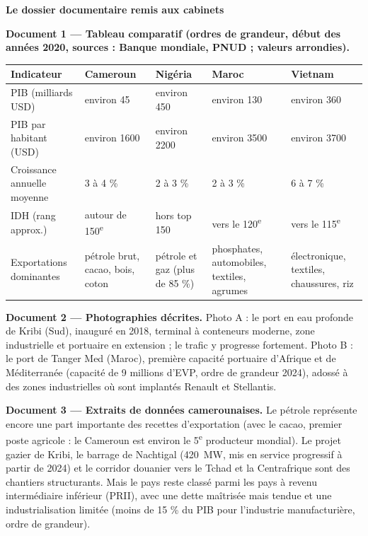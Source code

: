 \documentclass[11pt]{article}
\newcommand{\cle}[1]{{\popxbold\color{popdark}#1}}
\begin{document}
\textbf{Le dossier documentaire remis aux cabinets}

\textbf{Document 1 — Tableau comparatif (ordres de grandeur, début des années 2020, sources : Banque mondiale, PNUD ; valeurs arrondies).}

\begin{center}
\begin{tabularx}{\linewidth}{|l|X|X|X|X|}
\hline
\rowcolor{popblueL} \textbf{Indicateur} & \textbf{Cameroun} & \textbf{Nigéria} & \textbf{Maroc} & \textbf{Vietnam} \\
\hline
PIB (milliards USD) & environ \num{45} & environ \num{450} & environ \num{130} & environ \num{360} \\
\hline
PIB par habitant (USD) & environ \num{1600} & environ \num{2200} & environ \num{3500} & environ \num{3700} \\
\hline
Croissance annuelle moyenne & 3 à 4 \% & 2 à 3 \% & 2 à 3 \% & 6 à 7 \% \\
\hline
IDH (rang approx.) & autour de 150\textsuperscript{e} & hors top 150 & vers le 120\textsuperscript{e} & vers le 115\textsuperscript{e} \\
\hline
Exportations dominantes & pétrole brut, cacao, bois, coton & pétrole et gaz (plus de 85 \%) & phosphates, automobiles, textiles, agrumes & électronique, textiles, chaussures, riz \\
\hline
\end{tabularx}
\end{center}

\textbf{Document 2 — Photographies décrites.} Photo A : le \cle{port en eau profonde de Kribi} (Sud), inauguré en 2018, terminal à conteneurs moderne, zone industrielle et portuaire en extension ; le trafic y progresse fortement. Photo B : le port de \cle{Tanger Med} (Maroc), première capacité portuaire d'Afrique et de Méditerranée (capacité de 9 millions d'EVP, ordre de grandeur 2024), adossé à des zones industrielles où sont implantés Renault et Stellantis.

\textbf{Document 3 — Extraits de données camerounaises.} Le pétrole représente encore une part importante des recettes d'exportation (avec le cacao, premier poste agricole : le Cameroun est environ le 5\textsuperscript{e} producteur mondial). Le projet gazier de Kribi, le barrage de Nachtigal (\SI{420}{MW}, mis en service progressif à partir de 2024) et le corridor douanier vers le Tchad et la Centrafrique sont des chantiers structurants. Mais le pays reste classé parmi les \cle{pays à revenu intermédiaire inférieur} (PRII), avec une dette maîtrisée mais tendue et une industrialisation limitée (moins de 15 \% du PIB pour l'industrie manufacturière, ordre de grandeur).
\end{document}
